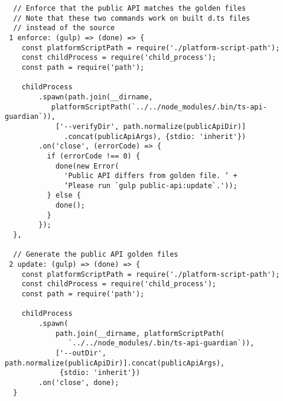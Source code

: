 \begin{verbatim}
  // Enforce that the public API matches the golden files
  // Note that these two commands work on built d.ts files
  // instead of the source
 1 enforce: (gulp) => (done) => {
    const platformScriptPath = require('./platform-script-path');
    const childProcess = require('child_process');
    const path = require('path');

    childProcess
        .spawn(path.join(__dirname,
           platformScriptPath(`../../node_modules/.bin/ts-api-guardian`)),
            ['--verifyDir', path.normalize(publicApiDir)]
              .concat(publicApiArgs), {stdio: 'inherit'})
        .on('close', (errorCode) => {
          if (errorCode !== 0) {
            done(new Error(
              'Public API differs from golden file. ‘ +
              ‘Please run `gulp public-api:update`.'));
          } else {
            done();
          }
        });
  },

  // Generate the public API golden files
 2 update: (gulp) => (done) => {
    const platformScriptPath = require('./platform-script-path');
    const childProcess = require('child_process');
    const path = require('path');

    childProcess
        .spawn(
            path.join(__dirname, platformScriptPath(
               `../../node_modules/.bin/ts-api-guardian`)),
            ['--outDir', path.normalize(publicApiDir)].concat(publicApiArgs),
             {stdio: 'inherit'})
        .on('close', done);
  }
\end{verbatim}
